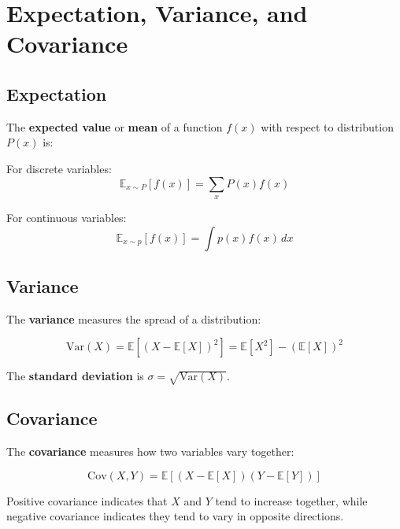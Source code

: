 
\section{Expectation, Variance, and Covariance}
\label{sec:expectation-variance}

\subsection{Expectation}

The \textbf{expected value} or \textbf{mean} of a function $f(x)$ with respect to distribution $P(x)$ is:

For discrete variables:
\begin{equation}
\mathbb{E}_{x \sim P}[f(x)] = \sum_{x} P(x) f(x)
\end{equation}

For continuous variables:
\begin{equation}
\mathbb{E}_{x \sim p}[f(x)] = \int p(x) f(x) \, dx
\end{equation}

\subsection{Variance}

The \textbf{variance} measures the spread of a distribution:

\begin{equation}
\text{Var}(X) = \mathbb{E}[(X - \mathbb{E}[X])^2] = \mathbb{E}[X^2] - (\mathbb{E}[X])^2
\end{equation}

The \textbf{standard deviation} is $\sigma = \sqrt{\text{Var}(X)}$.

\subsection{Covariance}

The \textbf{covariance} measures how two variables vary together:

\begin{equation}
\text{Cov}(X, Y) = \mathbb{E}[(X - \mathbb{E}[X])(Y - \mathbb{E}[Y])]
\end{equation}

Positive covariance indicates that $X$ and $Y$ tend to increase together, while negative covariance indicates they tend to vary in opposite directions.

